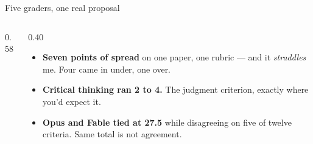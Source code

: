 \documentclass[aspectratio=169, 10pt]{beamer}
\begin{document}
\begin{frame}{Five graders, one real proposal}
\begin{columns}[T]
\begin{column}{0.58\textwidth}
\end{column}
\begin{column}{0.40\textwidth}
\begin{tcolorbox}[keybox, title={\faSearch\quad What that table says}, top=2pt, bottom=2pt]
\scriptsize
\begin{itemize}\setlength{\itemsep}{3pt}
  \item \textbf{Seven points of spread} on one paper, one rubric --- and it \emph{straddles} me. Four came in under, one over.
  \item \textbf{Critical thinking ran 2 to 4.} The judgment criterion, exactly where you'd expect it.
  \item \textbf{Opus and Fable tied at 27.5} while disagreeing on five of twelve criteria. Same total is not agreement.
\end{itemize}
\end{tcolorbox}
\vskip3pt
\end{column}
\end{columns}
\end{frame}
\end{document}

